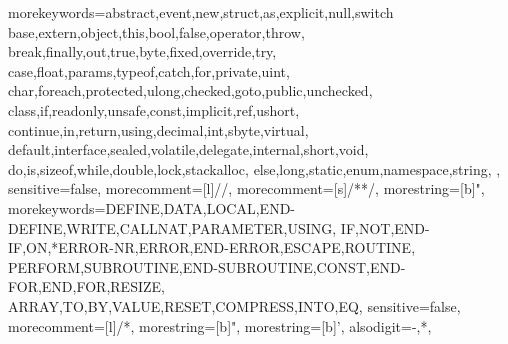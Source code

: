 \usepackage{floatflt}
\usepackage{float}

\usepackage{pdfpages}

\usepackage{listings}
\lstset{
    float=hbp,
    basicstyle=\footnotesize,
    columns=flexible,
    tabsize=2,
    frame=single,
    extendedchars=true,
    showspaces=false,
    showstringspaces=false,
    numbers=left,
    numberstyle=\tiny,
    breaklines=true,
    breakautoindent=true,
    captionpos=b,
    }
\usepackage{xcolor} 
  {morekeywords={abstract,event,new,struct,as,explicit,null,switch
		base,extern,object,this,bool,false,operator,throw,
		break,finally,out,true,byte,fixed,override,try,
		case,float,params,typeof,catch,for,private,uint,
		char,foreach,protected,ulong,checked,goto,public,unchecked,
		class,if,readonly,unsafe,const,implicit,ref,ushort,
		continue,in,return,using,decimal,int,sbyte,virtual,
		default,interface,sealed,volatile,delegate,internal,short,void,
		do,is,sizeof,while,double,lock,stackalloc,
		else,long,static,enum,namespace,string, },
	  sensitive=false,
	  morecomment=[l]{//},
	  morecomment=[s]{/*}{*/},
	  morestring=[b]",
}
  {morekeywords={DEFINE,DATA,LOCAL,END-DEFINE,WRITE,CALLNAT,PARAMETER,USING,%
               IF,NOT,END-IF,ON,*ERROR-NR,ERROR,END-ERROR,ESCAPE,ROUTINE,%
               PERFORM,SUBROUTINE,END-SUBROUTINE,CONST,END-FOR,END,FOR,RESIZE,%
               ARRAY,TO,BY,VALUE,RESET,COMPRESS,INTO,EQ},
	  sensitive=false,
	  morecomment=[l]{/*},
	  morestring=[b]",
	  morestring=[b]',
	  alsodigit={-,*},
}

